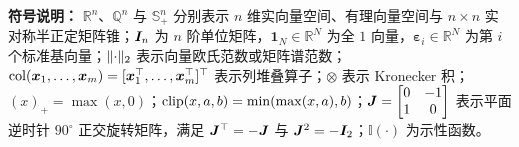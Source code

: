 \textbf{符号说明：} $\mathbb R^n$、$\mathbb Q^n$ 与 $\mathbb S_+^n$ 分别表示 $n$ 维实向量空间、有理向量空间与 $n\times n$ 实对称半正定矩阵锥；$\boldsymbol{I}_n$ 为 $n$ 阶单位矩阵，$\boldsymbol 1_N\in\mathbb R^N$ 为全 $1$ 向量，$\boldsymbol\varepsilon_i\in\mathbb R^N$ 为第 $i$ 个标准基向量；$\lVert\cdot\rVert_2$ 表示向量欧氏范数或矩阵谱范数；$\operatorname{col}(\boldsymbol x_1,\dots,\boldsymbol x_m)=[\boldsymbol x_1^{\top},\dots,\boldsymbol x_m^{\top}]^{\top}$ 表示列堆叠算子；$\otimes$ 表示 Kronecker 积；$(x)_+=\max(x,0)$；$\operatorname{clip}(x,a,b)=\min(\max(x,a),b)$；$\boldsymbol{J}=\begin{bmatrix}0&-1\\1&0\end{bmatrix}$ 表示平面逆时针 $90^\circ$ 正交旋转矩阵，满足 $\boldsymbol{J}^{\top}=-\boldsymbol{J}$ 与 $\boldsymbol{J}^2=-\boldsymbol{I}_2$；$\mathbb I(\cdot)$ 为示性函数。
